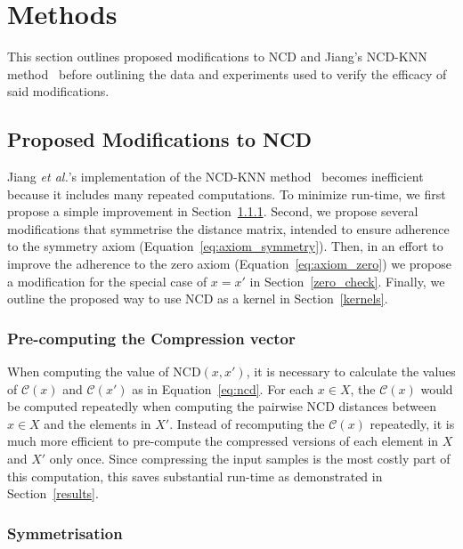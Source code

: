 \documentclass[preprint,12pt]{article}
\begin{document}
\section{Methods}
\label{methods}

This section outlines proposed modifications to NCD and Jiang's NCD-KNN method~\cite{jiang2022less} before outlining the data and experiments used to verify the efficacy of said modifications.



\subsection{Proposed Modifications to NCD}
\label{improvements}

Jiang \textit{et al.}'s implementation of the NCD-KNN method~\cite{jiang2022less} becomes inefficient because it includes many repeated computations.
To minimize run-time, we first propose a simple improvement in Section~\ref{pre_compute_compression}.
Second, we propose several modifications that symmetrise the distance matrix, intended to ensure adherence to the symmetry axiom (Equation~\ref{eq:axiom_symmetry}).
Then, in an effort to improve the adherence to the zero axiom (Equation~\ref{eq:axiom_zero}) we propose a modification for the special case of $x=x'$ in Section~\ref{zero_check}.
Finally, we outline the proposed way to use NCD as a kernel in Section~\ref{kernels}.


\subsubsection{Pre-computing the Compression vector}
\label{pre_compute_compression}

When computing the value of NCD$(x,x')$, it is necessary to calculate the values of $\mathcal{C}(x)$ and $\mathcal{C}(x')$ as in Equation~\ref{eq:ncd}.
For each $x \in X$, the $\mathcal{C}(x)$ would be computed repeatedly when computing the pairwise NCD distances between $x\in X$ and the elements in $X'$.
Instead of recomputing the $\mathcal{C}(x)$ repeatedly, it is much more efficient to pre-compute the compressed versions of each element in $X$ and $X'$ only once.
Since compressing the input samples is the most costly part of this computation, this saves substantial run-time as demonstrated in Section~\ref{results}.


\subsubsection{Symmetrisation}
\label{symmetrisation}
\end{document}
